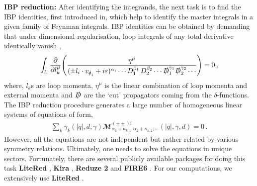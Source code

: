 \textbf{IBP reduction:}  After identifying the integrands, the next task is to find the IBP identities, first introduced in\cite{Chetyrkin:1981qh}, which help to identify the master integrals in a given family of Feynman integrals. IBP identities can be obtained by demanding that under dimensional regularisation, loop integrals of any total derivative identically vanish \cite{Weinzierl:2022eaz},
\begin{align}
    \int_{l_i}\frac{\partial}{\partial l_k^\mu}\Bigg(\frac{\eta^{\mu}}{(\pm l_i\cdot v_{\slashed{a}_i}+i\varepsilon)^{\alpha_i}\cdots D_1^{\beta_1}\,D_2^{\beta_2}\cdots \slashed{D}_1^{\gamma_1}\slashed{D}_2^{\gamma_2}\cdots}\Bigg)=0\,,\label{3.3a}
\end{align}
where, $l_k$s are loop momenta, $\eta^\mu$ is the linear combination of loop momenta and external momenta and $\slashed{D}$ are the `cut' propagators coming from the $\delta$-functions. The IBP reduction procedure generates a large number of homogeneous linear systems of equations of form,
\begin{align}
    \sum_k \gamma_k(|q|,d,\gamma)\mathbfcal{M}^{(\pm\pm)i}_{\alpha_1+\kappa_{k,1},\alpha_2+\kappa_{k,2},\cdots}(|q|,\gamma,d)=0\,.
\end{align}
However, all the equations are not independent but rather related by various symmetry relations. Ultimately, one needs to solve the equations in unique sectors. Fortunately, there are several publicly available packages for doing this task \textbf{LiteRed} \cite{Lee:2012cn,Lee:2013mka}, \textbf{Kira} \cite{Maierhofer:2017gsa}, \textbf{Reduze 2} \cite{vonManteuffel:2012np} and \textbf{FIRE6} \cite{Smirnov:2019qkx}. For our computations, we extensively use \textbf{LiteRed} .

